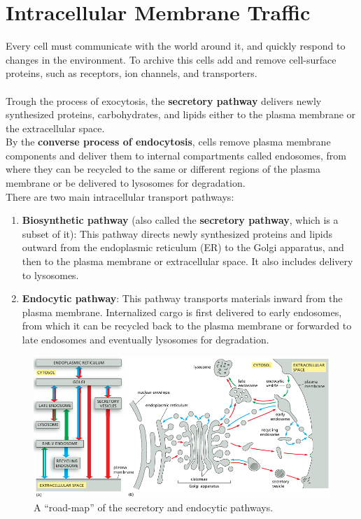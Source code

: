 \documentclass[../main.tex]{subfiles}
\begin{document}
\section{Intracellular Membrane Traffic}
Every cell must communicate with the world around it, and quickly respond to changes in the environment. To archive this cells add and remove cell-surface proteins, such as receptors, ion channels, and transporters. \\
\\
Trough the process of exocytosis, the \textbf{secretory pathway} delivers newly synthesized proteins, carbohydrates, and lipids either to the plasma membrane or the extracellular space. \\
\indent By the \textbf{converse process of endocytosis}, cells remove plasma membrane components and deliver them to internal compartments called endosomes, from where they can be recycled to the same or different regions of the plasma membrane or be delivered to lysosomes for degradation. \\

There are two main intracellular transport pathways:
\begin{enumerate}
	\item \textbf{Biosynthetic pathway} (also called the \textbf{secretory pathway}, which is a subset of it): This pathway directs newly synthesized proteins and lipids outward from the endoplasmic reticulum (ER) to the Golgi apparatus, and then to the plasma membrane or extracellular space. It also includes delivery to lysosomes.
	
	\item \textbf{Endocytic pathway}: This pathway transports materials inward from the plasma membrane. Internalized cargo is first delivered to early endosomes, from which it can be recycled back to the plasma membrane or forwarded to late endosomes and eventually lysosomes for degradation.
\end{enumerate}

\begin{figure}[H]
	\centering
	\includegraphics[width=\textwidth]{3}
	\caption{A “road-map” of the secretory and endocytic pathways.}
	\label{roead_map}
\end{figure}
\end{document}
